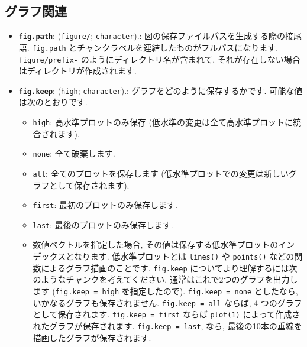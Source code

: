 \documentclass[
]{bxjsreport}
\providecommand{\tightlist}{%
  \setlength{\itemsep}{0pt}\setlength{\parskip}{0pt}}
\begin{document}
\hypertarget{plots}{%
\subsection{グラフ関連}\label{plots}}

\begin{itemize}
\tightlist
\item
  \textbf{\texttt{fig.path}}:
  (\texttt{\textquotesingle{}figure/\textquotesingle{}};
  \texttt{character}).: 図の保存ファイルパスを生成する際の接尾語.
  \texttt{fig.path} とチャンクラベルを連結したものがフルパスになります.
  \texttt{figure/prefix-} のようにディレクトリ名が含まれて,
  それが存在しない場合はディレクトリが作成されます.
\item
  \textbf{\texttt{fig.keep}}:
  (\texttt{\textquotesingle{}high\textquotesingle{}};
  \texttt{character}).: グラフをどのように保存するかです.
  可能な値は次のとおりです.

  \begin{itemize}
  \tightlist
  \item
    \texttt{high}: 高水準プロットのみ保存
    (低水準の変更は全て高水準プロットに統合されます).
  \item
    \texttt{none}: 全て破棄します.
  \item
    \texttt{all}: 全てのプロットを保存します
    (低水準プロットでの変更は新しいグラフとして保存されます).
  \item
    \texttt{first}: 最初のプロットのみ保存します.
  \item
    \texttt{last}: 最後のプロットのみ保存します.
  \item
    数値ベクトルを指定した場合,
    その値は保存する低水準プロットのインデックスとなります.
    低水準プロットとは \texttt{lines()} や \texttt{points()}
    などの関数によるグラフ描画のことです. \texttt{fig.keep}
    についてより理解するには次のようなチャンクを考えてください.
    通常はこれで2つのグラフを出力します
    (\texttt{fig.keep\ =\ \textquotesingle{}high\textquotesingle{}}
    を指定したので).
    \texttt{fig.keep\ =\ \textquotesingle{}none\textquotesingle{}}
    としたなら, いかなるグラフも保存されません.
    \texttt{fig.keep\ =\ \textquotesingle{}all\textquotesingle{}}
    ならば, 4 つのグラフとして保存されます.
    \texttt{fig.keep\ =\ \textquotesingle{}first\textquotesingle{}}
    ならば \texttt{plot(1)} によって作成されたグラフが保存されます.
    \texttt{fig.keep\ =\ \textquotesingle{}last\textquotesingle{}},
    なら, 最後の10本の垂線を描画したグラフが保存されます.
  \end{itemize}
\end{itemize}
\end{document}
